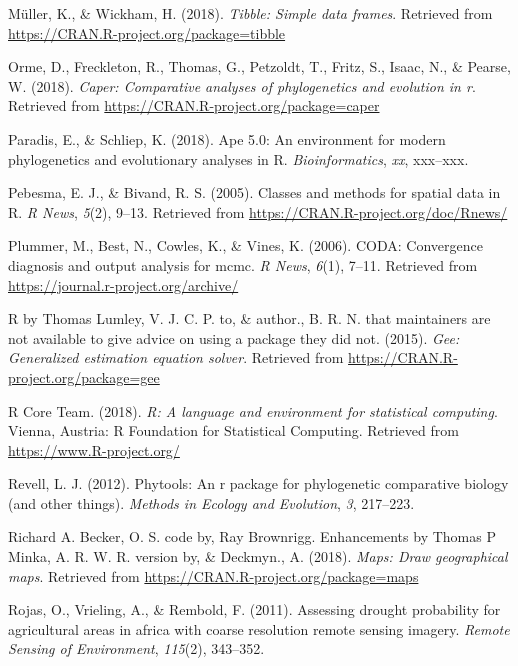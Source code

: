 \documentclass[man,floatsintext]{apa6}
\theoremstyle{definition}
\theoremstyle{definition}
\theoremstyle{definition}
\theoremstyle{remark}
\begin{document}
\leavevmode\hypertarget{ref-R-tibble}{}%
Müller, K., \& Wickham, H. (2018). \emph{Tibble: Simple data frames}.
Retrieved from \url{https://CRAN.R-project.org/package=tibble}

\leavevmode\hypertarget{ref-R-caper}{}%
Orme, D., Freckleton, R., Thomas, G., Petzoldt, T., Fritz, S., Isaac,
N., \& Pearse, W. (2018). \emph{Caper: Comparative analyses of
phylogenetics and evolution in r}. Retrieved from
\url{https://CRAN.R-project.org/package=caper}

\leavevmode\hypertarget{ref-R-ape}{}%
Paradis, E., \& Schliep, K. (2018). Ape 5.0: An environment for modern
phylogenetics and evolutionary analyses in R. \emph{Bioinformatics},
\emph{xx}, xxx--xxx.

\leavevmode\hypertarget{ref-R-sp}{}%
Pebesma, E. J., \& Bivand, R. S. (2005). Classes and methods for spatial
data in R. \emph{R News}, \emph{5}(2), 9--13. Retrieved from
\url{https://CRAN.R-project.org/doc/Rnews/}

\leavevmode\hypertarget{ref-R-coda}{}%
Plummer, M., Best, N., Cowles, K., \& Vines, K. (2006). CODA:
Convergence diagnosis and output analysis for mcmc. \emph{R News},
\emph{6}(1), 7--11. Retrieved from
\url{https://journal.r-project.org/archive/}

\leavevmode\hypertarget{ref-R-gee}{}%
R by Thomas Lumley, V. J. C. P. to, \& author., B. R. N. that
maintainers are not available to give advice on using a package they did
not. (2015). \emph{Gee: Generalized estimation equation solver}.
Retrieved from \url{https://CRAN.R-project.org/package=gee}

\leavevmode\hypertarget{ref-R-base}{}%
R Core Team. (2018). \emph{R: A language and environment for statistical
computing}. Vienna, Austria: R Foundation for Statistical Computing.
Retrieved from \url{https://www.R-project.org/}

\leavevmode\hypertarget{ref-R-phytools}{}%
Revell, L. J. (2012). Phytools: An r package for phylogenetic
comparative biology (and other things). \emph{Methods in Ecology and
Evolution}, \emph{3}, 217--223.

\leavevmode\hypertarget{ref-R-maps}{}%
Richard A. Becker, O. S. code by, Ray Brownrigg. Enhancements by Thomas
P Minka, A. R. W. R. version by, \& Deckmyn., A. (2018). \emph{Maps:
Draw geographical maps}. Retrieved from
\url{https://CRAN.R-project.org/package=maps}

\leavevmode\hypertarget{ref-rojas2011assessing}{}%
Rojas, O., Vrieling, A., \& Rembold, F. (2011). Assessing drought
probability for agricultural areas in africa with coarse resolution
remote sensing imagery. \emph{Remote Sensing of Environment},
\emph{115}(2), 343--352.
\end{document}
